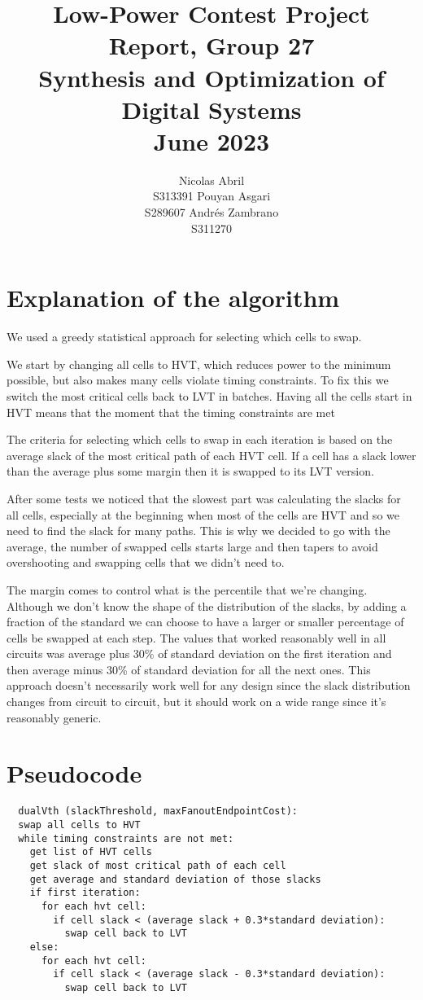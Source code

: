 \documentclass[11pt]{article}
\title{Low-Power Contest Project Report, Group 27\\Synthesis and Optimization of Digital Systems\\June 2023}
\author{Nicolas Abril \\ S313391 \And  
        Pouyan Asgari \\ S289607 \And
        Andrés Zambrano \\ S311270}
\begin{document}
\maketitle

\section{Explanation of the algorithm}

We used a greedy statistical approach for selecting which cells to swap.

We start by changing all cells to HVT, which reduces power to the minimum possible, but also makes many cells violate timing constraints. To fix this we switch the most critical cells back to LVT in batches.  
Having all the cells start in HVT means that the moment that the timing constraints are met 

The criteria for selecting which cells to swap in each iteration is based on the average slack of the most critical path of each HVT cell. If a cell has a slack lower than the average plus some margin then it is swapped to its LVT version.

After some tests we noticed that the slowest part was calculating the slacks for all cells, especially at the beginning when most of the cells are HVT and so we need to find the slack for many paths. This is why we decided to go with the average, the number of swapped cells starts large and then tapers to avoid overshooting and swapping cells that we didn't need to.

The margin comes to control what is the percentile that we're changing. Although we don't know the shape of the distribution of the slacks, by adding a fraction of the standard we can choose to have a larger or smaller percentage of cells be swapped at each step.  
The values that worked reasonably well in all circuits was average plus 30\% of standard deviation on the first iteration and then average minus 30\% of standard deviation for all the next ones. This approach doesn't necessarily work well for any design since the slack distribution changes from circuit to circuit, but it should work on a wide range since it's reasonably generic.

\section{Pseudocode}

\begin{verbatim}
  dualVth (slackThreshold, maxFanoutEndpointCost):
  swap all cells to HVT
  while timing constraints are not met:
    get list of HVT cells
    get slack of most critical path of each cell
    get average and standard deviation of those slacks
    if first iteration:
      for each hvt cell:
        if cell slack < (average slack + 0.3*standard deviation):
          swap cell back to LVT
    else:
      for each hvt cell:
        if cell slack < (average slack - 0.3*standard deviation):
          swap cell back to LVT
\end{verbatim}
\end{document}
